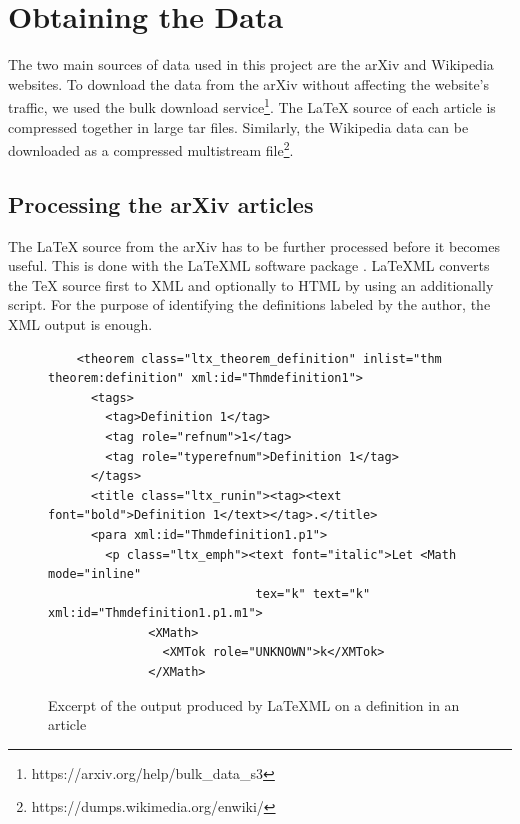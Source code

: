 \documentclass[a4paper]{easychair}
\begin{document}
\section{Obtaining the Data}
The two main sources of data used in this project are the arXiv and Wikipedia websites. To download the data from the arXiv without affecting the website's traffic, we used the bulk download service\footnote{https://arxiv.org/help/bulk\_data\_s3}. The \LaTeX{} source of each article is compressed together in large tar files. Similarly, the Wikipedia data can be downloaded as a compressed multistream file\footnote{https://dumps.wikimedia.org/enwiki/}. 

\subsection{Processing the arXiv articles}
The \LaTeX{} source from the arXiv has to be further processed before it becomes useful. This is done with the LaTeXML software package \cite{miller3latexml}. LaTeXML converts the \TeX{} source first to XML and optionally to HTML by using an additionally script. For the purpose of identifying the definitions labeled by the author, the XML output is enough.

\begin{center}
\begin{figure}[h]
\begin{lstlisting}
    <theorem class="ltx_theorem_definition" inlist="thm theorem:definition" xml:id="Thmdefinition1">
      <tags>
        <tag>Definition 1</tag>
        <tag role="refnum">1</tag>
        <tag role="typerefnum">Definition 1</tag>
      </tags>
      <title class="ltx_runin"><tag><text font="bold">Definition 1</text></tag>.</title>
      <para xml:id="Thmdefinition1.p1">
        <p class="ltx_emph"><text font="italic">Let <Math mode="inline" 
                             tex="k" text="k" xml:id="Thmdefinition1.p1.m1">
              <XMath>
                <XMTok role="UNKNOWN">k</XMTok>
              </XMath>
\end{lstlisting}
    \caption{\label{xml1} Excerpt of the output produced by LaTeXML on a definition in an article}
\end{figure}
\end{center}

\end{document}
